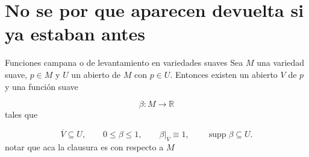 \section{No se por que aparecen devuelta si ya estaban antes}
\begin{booklemma}{Funciones campana o de levantamiento en variedades suaves}
Sea $M$ una variedad suave, $p\in M$ y $U$ un abierto de $M$ con $p\in U$. Entonces existen un abierto $V$ de $p$ y una función suave

\[
\beta:M\to\mathbb R
\]
tales que

\[
\overline V\subseteq U,\qquad 0\le \beta\le 1,\qquad \beta|_{\overline V}\equiv 1,\qquad \operatorname{supp}\beta\subseteq U.
\]
notar que aca la clausura es con respecto a $M$

\end{booklemma}
